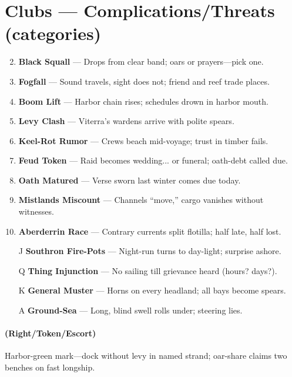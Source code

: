 \section*{Clubs --- Complications/Threats (categories)}
\label{sec:linn-complications}
\begin{enumerate}
\setcounter{enumi}{1}
\item \textbf{Black Squall} --- Drops from clear band; oars or prayers---pick one.
\item \textbf{Fogfall} --- Sound travels, sight does not; friend and reef trade places.
\item \textbf{Boom Lift} --- Harbor chain rises; schedules drown in harbor mouth.
\item \textbf{Levy Clash} --- Viterra's wardens arrive with polite spears.
\item \textbf{Keel-Rot Rumor} --- Crews beach mid-voyage; trust in timber fails.
\item \textbf{Feud Token} --- Raid becomes wedding... or funeral; oath-debt called due.
\item \textbf{Oath Matured} --- Verse sworn last winter comes due today.
\item \textbf{Mistlands Miscount} --- Channels ``move,'' cargo vanishes without witnesses.
\item \textbf{Aberderrin Race} --- Contrary currents split flotilla; half late, half lost.
\item[J] \textbf{Southron Fire-Pots} --- Night-run turns to day-light; surprise ashore.
\item[Q] \textbf{Thing Injunction} --- No sailing till grievance heard (hours? days?).
\item[K] \textbf{General Muster} --- Horns on every headland; all bays become spears.
\item[A] \textbf{Ground-Sea} --- Long, blind swell rolls under; steering lies.
\end{enumerate}

\paragraph*{(Right/Token/Escort)} Harbor-green mark---dock without levy in named strand; oar-share claims two benches on fast longship.

